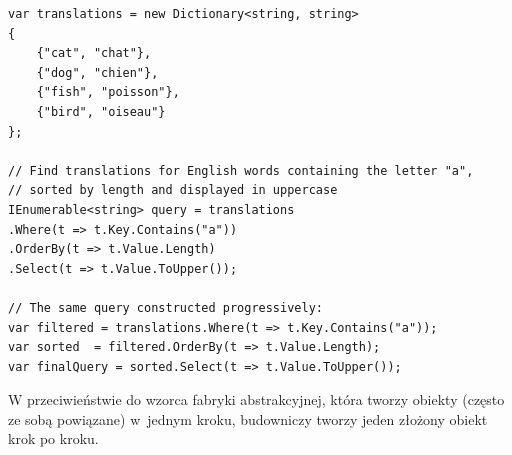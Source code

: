\begin{lstlisting}[caption={Wykorzystanie płynnych interfejsów w zapytania LINQ}, label={lab2/lst/fluentInterfaceLinq}]
var translations = new Dictionary<string, string>
{
	{"cat", "chat"},
	{"dog", "chien"},
	{"fish", "poisson"},
	{"bird", "oiseau"}
};

// Find translations for English words containing the letter "a",
// sorted by length and displayed in uppercase
IEnumerable<string> query = translations
.Where(t => t.Key.Contains("a"))
.OrderBy(t => t.Value.Length)
.Select(t => t.Value.ToUpper());

// The same query constructed progressively:
var filtered = translations.Where(t => t.Key.Contains("a"));
var sorted  = filtered.OrderBy(t => t.Value.Length);
var finalQuery = sorted.Select(t => t.Value.ToUpper());
\end{lstlisting}

W przeciwieństwie do wzorca fabryki abstrakcyjnej, która tworzy obiekty (często ze sobą powiązane) w~jednym kroku, budowniczy tworzy jeden złożony obiekt krok po kroku.

